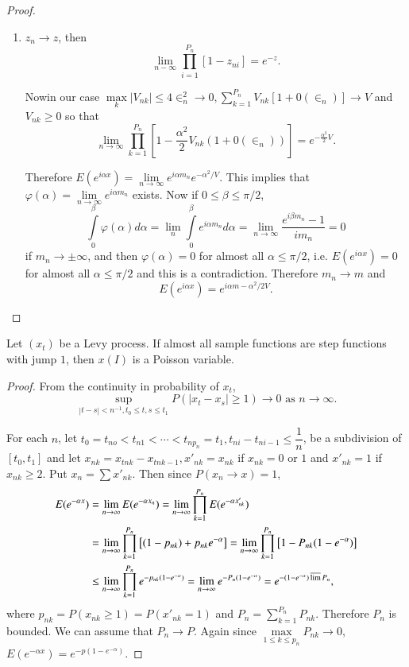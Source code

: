\begin{proof}
\begin{enumerate}
\item $z_n \to z$, then
  $$
  \lim_{n - \infty}\prod^{P_n}_{i=1}[1-z_{ni}]=e^{-z}.
  $$

  Now\pageoriginale in our case $\max\limits_k |V_{nk}| \leq 4 \in^2_n
  \to 0, \sum\limits^{P_n}_{k=1} V_{nk}[1+0 (\in_n)] \to V$ and
  $V_{nk}\geq 0$ so that 
  $$
  \lim_{n \to \infty}\prod^{P_n}_{k=1} \left[1-\frac{\alpha^2}{2}
    V_{nk}(1+0(\in_n))\right]=e^{-\frac{\alpha^2}{2}V}.    
  $$

  Therefore $E(e^{i \alpha x})=\lim \limits_{n \to \infty}e^{i \alpha
    m_n}e^{-\alpha^2/V}$. This implies that $\varphi (\alpha)=\lim
  \limits_{n \to \infty}e^{i \alpha m_n}$ exists. Now if $0 \leq \beta
  \leq \pi /2$, 
  $$
  \int\limits^\beta_0 \varphi (\alpha)d \alpha =\lim_n 
\int\limits^\beta_0 e^{i\alpha m_n}d\alpha=\lim_{n \to \infty} 
\frac{e^{i \beta m_n}-1}{im_n}=0 
  $$
  if $m_n \to \pm \infty$, and then $\varphi (\alpha)=0$ for almost
  all $\alpha \leq \pi/2$, i.e. $E(e^{i \alpha x})=0$ for almost all
  $\alpha \leq \pi /2$ and this is a contradiction. Therefore $m_n \to
  m$ and  
  $$
  E(e^{i \alpha x})=e^{i \alpha m-\alpha^2/2V}.
  $$
\end{enumerate}
\end{proof}

\begin{thm}\label{chap4-sec2-thm2}%
Let $(x_t)$ be a Levy process. If almost all sample functions are
    step functions with jump $1$, then $x(I)$ is a Poisson variable. 
\end{thm}

\begin{proof}
From the continuity in probability of $x_t$,
$$
\sup_{|t-s|<n^{-1},t_0 \leq t,s\leq t_1}P(|x_t-x_s| \geq 1)\to 0
\text{ as } n \to \infty. 
$$

For each $n$, let $t_0=t_{no}<t_{n1}< \cdots <
    t_{np_n}=t_1,t_{ni}-t_{ni-1}\leq \dfrac{1}{n}$, be a subdivision
    of $[t_0,t_1]$ and let $ x_{nk} =
    x_{tnk}-x_{tnk-1},x'_{nk}=x_{nk}$ if $x_{nk}=0$ or $1$ and
    $x'_{nk}=1$ if $x_{nk}\geq 2$. Put $x_n=\sum x'_{nk}$. 
    Then since\pageoriginale
    $P(x_n \to x)=1$, 
    \begin{align*}
      E(e^{-\alpha x})&=\lim_{n \to \infty}E(e^{-\alpha x_n})=\lim_{n
        \to \infty} \prod^{P_n}_{k=1} E(e^{-\alpha x'_{nk}})\\ 
      &=\lim_{n \to \infty} \prod^{P_n}_{k=1}
      \left[(1-p_{nk})+p_{nk}e^{-\alpha}\right]=\lim_{n \to \infty}
      \prod^{P_n}_{k=1}\left[1-P_{nk}(1-e^{-\alpha})\right]\\ 
      &\leq \lim_{n \to \infty} \prod^{P_n}_{k=1} e^{-p_{nk}(1-e^{-
          \alpha})}= \lim_{n \to \infty} e^{-P_n(1-e^{-\alpha})} =
      e^{-(1-e^{- \alpha}) \varlimsup P_n}, 
    \end{align*}
    where $p_{nk}=P(x_{nk}\geq 1)=P(x'_{nk}=1)$ and $P_n= \sum
    \limits^{P_n}_{k=1}P_{nk}$. Therefore $P_n$ is bounded. We can
    assume that $P_n \to P$. Again since $\max\limits_{1 \leq k \leq
      p_n} P_{nk}\to 0$, $E(e^{- \alpha x})=e^{-p(1 - e^{- \alpha })}$. 
\end{proof}

